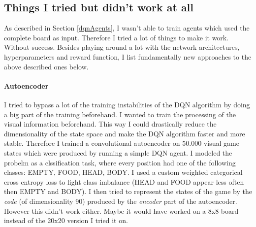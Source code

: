 \documentclass{article}
\begin{document}
\subsection{Things I tried but didn't work at all}
As described in Section \ref{dqnAgents}, I wasn't able to train agents which used the complete board as input. Therefore I tried a lot of things to make it work. Without success. Besides playing around a lot with the network architectures, hyperparameters and reward function, I list fundamentally new approaches to the above described ones below.

\paragraph{Autoencoder} I tried to bypass a lot of the training instabilities of the DQN algorithm by doing a big part of the training beforehand. I wanted to train the processing of the visual information beforehand. This way I could drastically reduce the dimensionality of the state space and make the DQN algorithm faster and more stable. Therefore I trained a convolutional autoencoder on 50.000 visual game states which were produced by running a simple DQN agent. I modeled the probelm as a clssification task, where every position had one of the following classes: EMPTY, FOOD, HEAD, BODY. I used a custom weighted categorical cross entropy loss to fight class imbalance (HEAD and FOOD appear less often then EMPTY and BODY). I then tried to represent the states of the game by the \emph{code} (of dimensionality 90) produced by the \emph{encoder} part of the autoencoder. However this didn't work either. Maybe it would have worked on a 8x8 board instead of the 20x20 version I tried it on.
\end{document}
